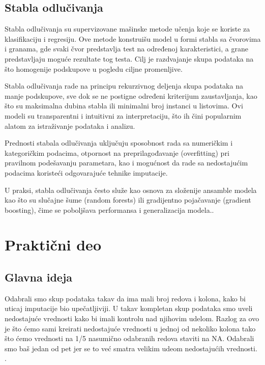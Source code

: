 \documentclass{article}
\begin{document}
\newpage

\subsection*{Stabla odlučivanja}

Stabla odlučivanja su supervizovane mašinske metode učenja koje se koriste za klasifikaciju i regresiju. Ove metode konstruišu model u formi stabla sa čvorovima i granama, gde svaki čvor predstavlja test na određenoj karakteristici, a grane predstavljaju moguće rezultate tog testa. Cilj je razdvajanje skupa podataka na što homogenije podskupove u pogledu ciljne promenljive.

Stabla odlučivanja rade na principu rekurzivnog deljenja skupa podataka na manje podskupove, sve dok se ne postigne određeni kriterijum zaustavljanja, kao što su maksimalna dubina stabla ili minimalni broj instanci u listovima. Ovi modeli su transparentni i intuitivni za interpretaciju, što ih čini popularnim alatom za istraživanje podataka i analizu.

Prednosti stabala odlučivanja uključuju sposobnost rada sa numeričkim i kategoričkim podacima, otpornost na preprilagođavanje (overfitting) pri pravilnom podešavanju parametara, kao i mogućnost da rade sa nedostajućim podacima koristeći odgovarajuće tehnike imputacije.

U praksi, stabla odlučivanja često služe kao osnova za složenije ansamble modela kao što su slučajne šume (random forests) ili gradijentno pojačavanje (gradient boosting), čime se poboljšava performansa i generalizacija modela.\cite{breiman1984}.



\newpage

\section*{Praktični deo}

\subsection*{Glavna ideja}

Odabrali smo skup podataka takav da ima mali broj redova i kolona, kako bi uticaj imputacije bio upečatljiviji. U takav kompletan skup podataka smo uveli nedostajuće vrednosti kako bi imali kontrolu nad njihovim udelom. Razlog za ovo je što ćemo sami kreirati nedostajuće vrednosti u jednoj od nekoliko kolona tako što ćemo vrednosti na 1/5 nasumično odabranih redova staviti na NA. Odabrali smo baš jedan od pet jer se to već smatra velikim udeom nedostajućih vrednosti. \cite{little2019}.
\end{document}
